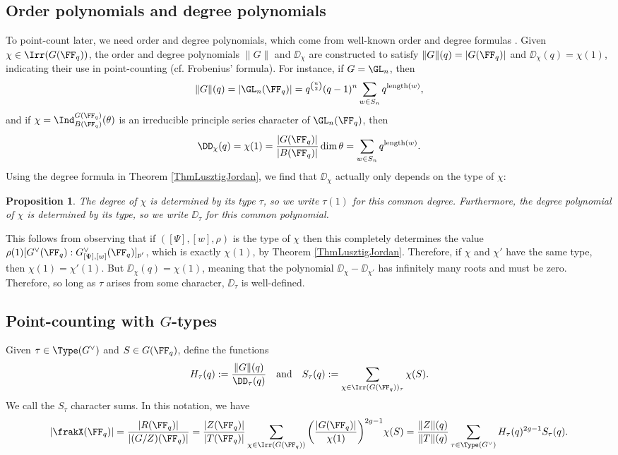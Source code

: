 \documentclass{amsart}
\theoremstyle{plain}
\newtheorem{prop}[thm]{Proposition}
\theoremstyle{definition}
\theoremstyle{remark}
\begin{document}
\subsection*{Order polynomials and degree polynomials}\label{SectionOrderDegreePolys}
To point-count later, we need order and degree polynomials, which come from well-known order and degree formulas \cite[Theorem 1.6.7, Definition 2.3.25]{GM20}. Given $\chi\in\Irr(G(\FF_q))$, the order and degree polynomials $\|G\|$ and $\DD_\chi$ are constructed to satisfy $\|G\|(q) = |G(\FF_q)|$ and $\DD_\chi(q)=\chi(1)$, indicating their use in point-counting (cf. Frobenius' formula). For instance, if $G=\GL_{n}$, then
\[
\|G\|(q) = |\GL_n(\FF_q)| = q^{\binom{n}{2}}(q-1)^n\sum_{w\in S_n} q^{\mathrm{length}(w)},
\]
and if $\chi=\Ind_{B(\FF_q)}^{G(\FF_q)}(\theta)$ is an irreducible principle series character of $\GL_n(\FF_q)$, then
\[
\DD_\chi(q) = \chi(1) = \frac{|G(\FF_q)|}{|B(\FF_q)|}\dim\theta = \sum_{w\in S_n}q^{\mathrm{length}(w)}.
\]
Using the degree formula in Theorem \ref{ThmLusztigJordan}, we find that $\DD_\chi$ actually only depends on the type of $\chi$:
\begin{prop}\label{PropTypeDegree}
The degree of $\chi$ is determined by its type $\tau$, so we write $\tau(1)$ for this common degree. Furthermore, the degree polynomial of $\chi$ is determined by its type, so we write $\DD_\tau$ for this common polynomial.  
\end{prop}

This follows from observing that if $([\Psi],[w],\rho)$ is the type of $\chi$ then this completely determines the value $\rho(1)[G^\vee(\FF_q):G^{\vee}_{[\Psi],[w]}(\FF_q)]_{p'}$, which is exactly $\chi(1)$, by Theorem \ref{ThmLusztigJordan}. Therefore, if $\chi$ and $\chi'$ have the same type, then $\chi(1)=\chi'(1)$. But $\DD_\chi(q)=\chi(1)$, meaning that the polynomial $\DD_\chi - \DD_{\chi'}$ has infinitely many roots and must be zero. Therefore, so long as $\tau$ arises from some character, $\DD_\tau$ is well-defined. 


\subsection*{Point-counting with $G$-types}\label{SectionPointCountingWithGTypes}
Given $\tau\in\Type(G^\vee)$ and $S\in G(\FF_q)$, define the functions
\[
H_\tau(q) := \frac{\|G\|(q)}{\DD_\tau(q)}\quad\text{and}\quad S_\tau(q) := \sum_{\chi\in\Irr(G(\FF_q))_\tau} \chi(S).
\]
We call the $S_\tau$ character sums. In this notation, we have
\[
|\frakX(\FF_q)| = \frac{|R(\FF_q)|}{|(G/Z)(\FF_q)|} = \frac{|Z(\FF_q)|}{|T(\FF_q)|}\sum_{\chi\in\Irr(G(\FF_q))} \bigg(\frac{|G(\FF_q)|}{\chi(1)}\bigg)^{2g-1} \chi(S) = \frac{\|Z\|(q)}{\|T\|(q)}\sum_{\tau\in\Type(G^\vee)} H_\tau(q)^{2g-1}S_\tau(q).
\]
\end{document}

